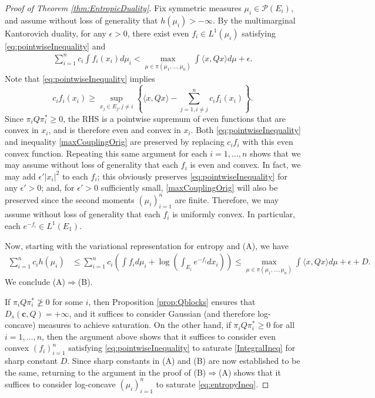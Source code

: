 \documentclass[10pt,a4paper]{amsart}
\begin{document}
\begin{proof}[Proof of Theorem \ref{thm:EntropicDuality}]
Fix symmetric measures $\mu_i \in \mathcal{P}(E_i)$, and assume without loss of generality that $h(\mu_i) > -\infty$.   
By the multimarginal Kantorovich duality, for any $\epsilon>0$, there exist even $f_i\in L^1(\mu_i)$ satisfying \eqref{eq:pointwiseInequality} and 
\begin{align}
\sum_{i=1}^n c_i \int f_i(x_i) d\mu_i  <   \max_{\mu \in \pi(\mu_1, \dots, \mu_n)} \int \langle x, Q x\rangle d\mu + \epsilon. \label{maxCouplingOrig}
\end{align}
Note that \eqref{eq:pointwiseInequality} implies
$$
c_i f_i(x_i) \geq \sup_{x_j \in E_j, j\neq i} \left\{ \langle x, Q x \rangle - \sum_{j=1, i\neq j}^n c_i f_i(x_i) \right\}.
$$
Since $\pi_i Q \pi_i^* \geq 0$, the RHS is a pointwise supremum of even functions that are convex in $x_i$, and is therefore  even and convex in $x_i$.  Both \eqref{eq:pointwiseInequality} and  inequality \eqref{maxCouplingOrig} are preserved by replacing $c_i f_i$ with this even convex function.  Repeating this same argument for each $i=1, \dots, n$ shows that we may assume without loss of generality that each $f_i$ is even and convex.  In fact, we may add $\epsilon' |x_i|^2$ to each $f_i$; this obviously preserves \eqref{eq:pointwiseInequality} for any $\epsilon'>0$; and, for $\epsilon'>0$ sufficiently small, \eqref{maxCouplingOrig} will also be preserved since the second moments $(\mu_i)_{i=1}^n$ are finite.  Therefore, we may assume without loss of generality that each $f_i$ is uniformly convex.  In particular, each $e^{-f_i} \in L^1(E_1)$.  



Now, starting with the variational representation for entropy and   (A), we have 
\begin{align*}
\sum_{i=1}^n c_i h(\mu_i)  &\leq \sum_{i=1}^n c_i \left( \int f_i d\mu_i +  \log\left( \int_{E_i} e^{-f_i} dx_i \right)   \right) 
\leq   \max_{\mu \in \pi(\mu_1, \dots, \mu_n)} \int \langle x, Q x\rangle d\mu + \epsilon + D.
\end{align*}
We conclude (A)$\Rightarrow$(B).  


If $\pi_iQ \pi^*_i \not\geq 0$ for some $i$, then Proposition \ref{prop:Qblocks} ensures that $D_s(\mathbf{c},Q)= +\infty$, and it suffices to consider  Gaussian (and therefore log-concave) measures to achieve  saturation.  On the other hand, if $\pi_iQ \pi^*_i  \geq 0$ for all $i=1, \dots, n$, then the argument above shows that it suffices to consider even convex $(f_i)_{i=1}^n$ satisfying \eqref{eq:pointwiseInequality} to saturate \eqref{IntegralIneq} for sharp constant $D$.  Since sharp constants in (A) and (B) are now established to be the same, returning to the argument in the proof of (B)$\Rightarrow$(A) shows that it suffices to consider log-concave $(\mu_i)_{i=1}^n$ to saturate \eqref{eq:entropyIneq}.
\end{proof}
\end{document}
